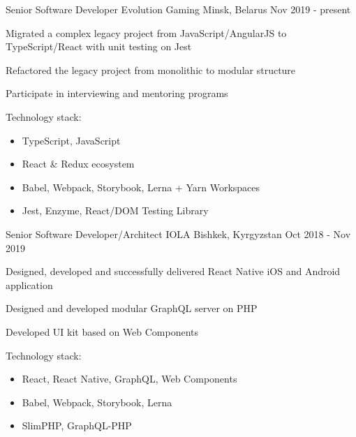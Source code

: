 

\begin{cventries}


  \cventry
    {Senior Software Developer} %
    {Evolution Gaming} %
    {Minsk, Belarus} %
    {Nov 2019 - present} %
    {
      \begin{cvitems}
        \item Migrated a complex legacy project from JavaScript/AngularJS to TypeScript/React with unit testing on Jest
        \item Refactored the legacy project from monolithic to modular structure
        \item Participate in interviewing and mentoring programs
      \end{cvitems}
      \vspace{5mm}
      Technology stack:
      \begin{itemize}[leftmargin=2ex, nosep, noitemsep]
        \item TypeScript, JavaScript
        \item React \& Redux ecosystem
        \item Babel, Webpack, Storybook, Lerna + Yarn Workspaces
        \item Jest, Enzyme, React/DOM Testing Library
      \end{itemize}
      \vspace{-4.0mm}
    }

  \cventry
    {Senior Software Developer/Architect} %
    {IOLA} %
    {Bishkek, Kyrgyzstan} %
    {Oct 2018 - Nov 2019} %
    {
      \begin{cvitems}
        \item Designed, developed and successfully delivered React Native iOS and Android application
        \item Designed and developed modular GraphQL server on PHP
        \item Developed UI kit based on Web Components
      \end{cvitems}
      \vspace{5mm}
      Technology stack:
      \begin{itemize}[leftmargin=2ex, nosep, noitemsep]
        \item React, React Native, GraphQL, Web Components
        \item Babel, Webpack, Storybook, Lerna
        \item SlimPHP, GraphQL-PHP
      \end{itemize}
      \vspace{-4.0mm}
    }


\end{cventries}
